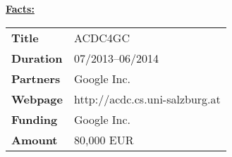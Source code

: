 \textcolor{\workinggroupboxtextcolor}{
	\textbf{\underline{Facts:}}
	\newline
	\newline
	\begin{tabular}{l p{}}
		\textbf{Title} & ACDC4GC \\
		\textbf{Duration} & 07/2013--06/2014 \\
		\textbf{Partners} & Google Inc. \\
		\textbf{Webpage} & http://acdc.cs.uni-salzburg.at \\
		\textbf{Funding} & Google Inc. \\
		\textbf{Amount} & 80,000 EUR 
	\end{tabular}
}